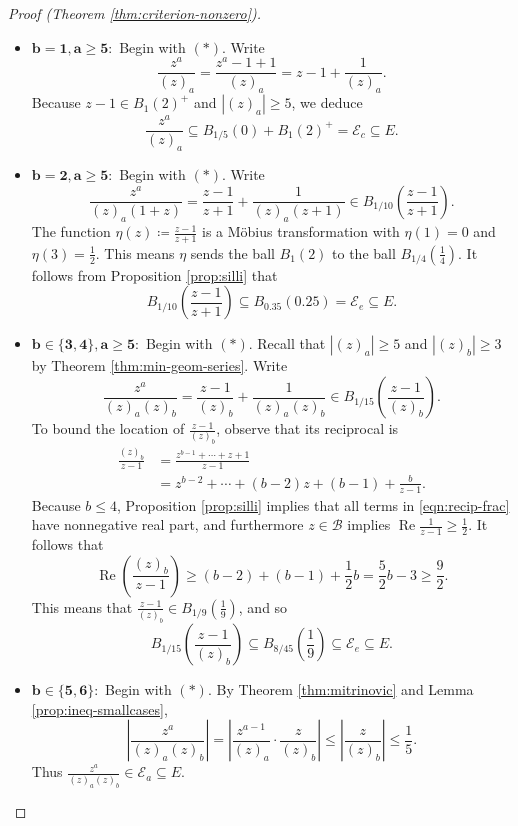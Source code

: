 \documentclass[11pt]{article}
\theoremstyle{definition}
\renewcommand{\Re}{\operatorname{Re}}
\newcommand{\ball}[2]{B_{#2}(#1)}
\newcommand{\calB}{\mathcal B}
\newcommand{\calE}{\mathcal E}
\begin{document}
\begin{proof}[Proof (Theorem \ref{thm:criterion-nonzero})]
\begin{itemize}
	\item $\boldsymbol{b=1, a\geq 5{:}}$ Begin with $(*)$. Write
	\[
	\frac{z^a}{(z)_a} = \frac{z^a - 1 + 1}{(z)_a} = z - 1 + \frac{1}{(z)_a}.
	\]
	Because $z-1\in \ball{2}{1}^+$ and $|(z)_a| \geq 5$, we deduce 
	\[
	\frac{z^a}{(z)_a}\subseteq \ball{0}{1/5} + \ball{2}{1}^+ = \calE_c\subseteq E.
	\]
	
	\item $\boldsymbol{b=2, a\geq 5{:}}$ Begin with $(*)$.  Write
	\[
	\frac{z^a}{(z)_a(1+z)} = \frac{z-1}{z+1} + \frac{1}{(z)_a(z+1)}\in B_{1/10}\left(\frac{z-1}{z+1}\right).
	\]
	The function $\eta(z)\coloneqq \frac{z-1}{z+1}$ is a M{\"o}bius transformation with $\eta(1) = 0$ and $\eta(3) = \tfrac12$.  This means $\eta$ sends the ball $\ball{2}{1}$ to the ball $\ball{\tfrac14}{1/4}$.  It follows from Proposition \ref{prop:silli} that 
	\[
	B_{1/10}\left(\frac{z-1}{z+1}\right)\subseteq \ball{0.25}{ 0.35} = \calE_e\subseteq E.
	\]
	
	\item $\boldsymbol{b\in\{3,4\}, a\geq 5{:}}$ Begin with $(*)$.  Recall that $|(z)_a| \geq 5$ and $|(z)_b| \geq 3$ by Theorem \ref{thm:min-geom-series}.  Write
	\[
	\frac{z^a}{(z)_a(z)_b} = \frac{z-1}{(z)_b} + \frac{1}{(z)_a(z)_b}\in B_{1/15}\left(\frac{z-1}{(z)_b}\right).
	\]
	To bound the location of $\tfrac{z-1}{(z)_b}$, observe that its reciprocal is
	\begin{align}
		\frac{(z)_b}{z-1} &= \frac{z^{b-1} + \cdots + z + 1}{z-1} \nonumber \\ &= z^{b-2} + \cdots +(b-2)z + (b-1) + \frac{b}{z-1}. \label{eqn:recip-frac}
	\end{align}
	Because $b\leq 4$, Proposition \ref{prop:silli} implies that all terms in \eqref{eqn:recip-frac} have nonnegative real part, and furthermore $z\in \calB$ implies $\Re \tfrac{1}{z-1} \geq \tfrac12$.  It follows that 
	\[
	\Re\left(\frac{(z)_b}{z-1}\right) \geq (b-2) + (b-1) + \frac 12b = \frac 52b - 3 \geq \frac 92.
	\] 
	This means that $\tfrac{z-1}{(z)_b}\in \ball{\tfrac 19}{1/9}$, and so
	\[
	B_{1/15}\left(\frac{z-1}{(z)_b}\right) \subseteq B_{8/45}\left(\frac 19\right)\subseteq\calE_e\subseteq E.
	\]
	
	\item $\boldsymbol{b\in\{5,6\}{:}}$ Begin with $(*)$.  By Theorem \ref{thm:mitrinovic} and Lemma \ref{prop:ineq-smallcases},
	\[
	\left|\frac{z^a}{(z)_a(z)_b}\right|= \left|\frac{z^{a-1}}{(z)_a}\cdot \frac{z}{(z)_b}\right| \leq \left|\frac{z}{(z)_b}\right| \leq \frac 15.
	\]
	Thus $\tfrac{z^a}{(z)_a(z)_b}\in \calE_a\subseteq E$.
	

\end{itemize}
\end{proof}
\end{document}
